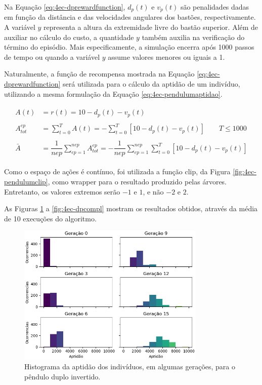 Na Equação \ref{eq:4ec-dprewardfunction}, $d_p(t)$ e $v_p(t)$ são penalidades dadas em função da distância e das velocidades angulares dos bastões, respectivamente. A variável $y$ representa a altura da extremidade livre do bastão superior. Além de auxiliar no cálculo do custo, a quantidade $y$ também auxilia na verificação do término do episódio. Mais especificamente, a simulação encerra após 1000 passos de tempo ou quando a variável $y$ assume valores menores ou iguais a 1.

Naturalmente, a função de recompensa mostrada na Equação \ref{eq:4ec-dprewardfunction} será utilizada para o cálculo da aptidão de um indivíduo, utilizando a mesma formulação da Equação \ref{eq:4ec-pendulumaptidao}.

\begin{align}\label{eq:4ec-dpaptidao}
\begin{split}
A(t) &= r(t) = 10 - d_p(t) - v_p(t)\\\\
A_{tot}^{ep} &= \sum_{t=0}^{T} A(t) = - \sum_{t=0}^{T} \left[
10 - d_p(t) - v_p(t)
\right]\qquad T \le 1000\\\\
\bar{A} &= \dfrac{1}{nep}\sum_{ep=1}^{nep} A_{tot}^{ep} =
-\dfrac{1}{nep}\sum_{ep=1}^{nep}\sum_{t=0}^{T}
\left[
10 - d_p(t) - v_p(t)
\right]
\end{split}
\end{align}

Como o espaço de ações é contínuo, foi utilizada a função clip, da Figura \ref{fig:4ec-pendulumclip}, como wrapper para o resultado produzido pelas árvores. Entretanto, os valores extremos serão $-1$ e $1$, e não $-2$ e $2$.

As Figuras \ref{fig:4ec-dpapthist} a \ref{fig:4ec-dpcompl} mostram os resultados obtidos, através da média de 10 execuções do algoritmo.

\begin{figure}[H]
	\centering
	\includegraphics[width=0.8\textwidth]{02_desenvolvimento/04_EC_Fig_DPAptHist.png}
	\caption{Histograma da aptidão dos indivíduos, em algumas gerações, para o pêndulo duplo invertido.}
	\label{fig:4ec-dpapthist}
\end{figure}

